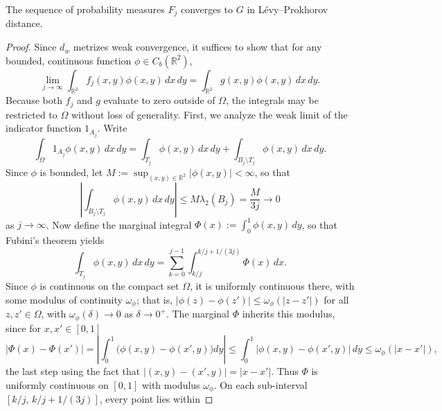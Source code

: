 \documentclass[10pt,a4paper]{amsart}
\newcommand{\RR}{\mathbb{R}}
\begin{document}
\begin{proposition}\label{prop:weak}
The sequence of probability measures $F_j$ converges to $G$ in L\'evy--Prokhorov distance.
\end{proposition}

\begin{proof}
Since $d_{w}$ metrizes weak convergence, it suffices to show that for any bounded, continuous function $\phi \in C_b(\RR^2)$,
\begin{equation*}
    \lim_{j \to \infty} \int_{\RR^2} f_j(x,y) \phi(x,y) \, dx \, dy = \int_{\RR^2} g(x,y)\phi(x,y) \, dx \, dy.
\end{equation*}
Because both $f_j$ and $g$ evaluate to zero outside of $\Omega$, the integrals may be restricted
to $\Omega$ without loss of generality. First, we analyze the weak limit of the indicator function $1_{A_j}$. Write
\begin{equation*}
    \int_\Omega 1_{A_j} \phi(x,y) \, dx \, dy = \int_{T_j} \phi(x,y) \, dx \, dy + \int_{B_j \setminus T_j} \phi(x,y) \, dx \, dy.
\end{equation*}
Since $\phi$ is bounded, let $M := \sup_{(x,y)\in\RR^2} |\phi(x,y)|<\infty$, so that
\begin{equation*}
    \left| \int_{B_j \setminus T_j} \phi(x,y) \, dx \, dy \right| \leq M \lambda_2(B_j) = \frac{M}{3j} \to 0
\end{equation*}
as $j\to\infty$. Now define the marginal integral $\Phi(x) := \int_0^1 \phi(x,y) \, dy$, so that Fubini's theorem yields
\begin{equation*}
    \int_{T_j} \phi(x,y) \, dx \, dy = \sum_{k=0}^{j-1} \int_{k/j}^{k/j + 1/(3j)} \Phi(x) \, dx.
\end{equation*}
Since $\phi$ is continuous on the compact set $\Omega$, it is uniformly continuous
there, with some modulus of continuity $\omega_\phi$; that is, $|\phi(z) - \phi(z')| \leq
\omega_\phi(|z - z'|)$ for all $z, z' \in \Omega$, with $\omega_\phi(\delta) \to 0$ as
$\delta \to 0^+$. The marginal $\Phi$ inherits this modulus, since for $x, x' \in [0,1]$
\begin{equation*}
    |\Phi(x) - \Phi(x')|
    = \left| \int_0^1 \bigl( \phi(x,y) - \phi(x',y) \bigr) dy \right|
    \leq \int_0^1 \bigl| \phi(x,y) - \phi(x',y) \bigr| \, dy
    \leq \omega_\phi(|x - x'|),
\end{equation*}
the last step using the fact that $|(x,y) - (x',y)| = |x - x'|$. Thus $\Phi$ is uniformly continuous on $[0,1]$
with modulus $\omega_\phi$. On each sub-interval $[k/j,\, k/j + 1/(3j)]$, every point lies within

\end{proof}
\end{document}
